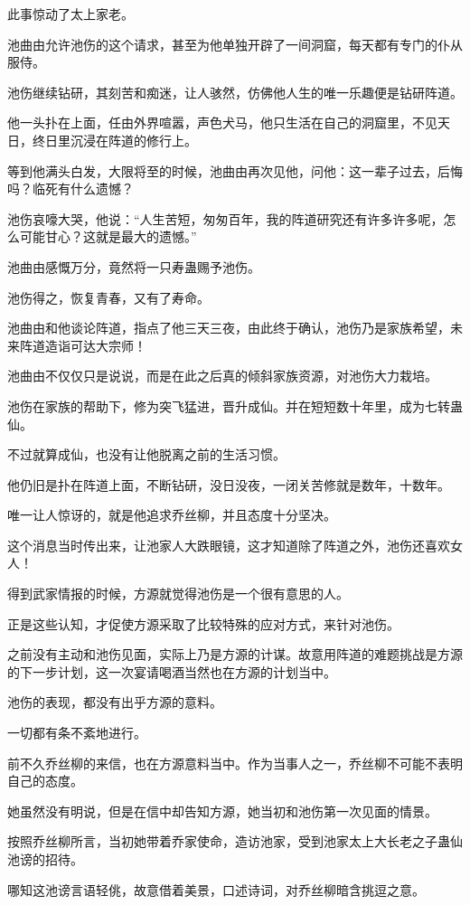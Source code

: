 \begin{this_body}
此事惊动了太上家老。

池曲由允许池伤的这个请求，甚至为他单独开辟了一间洞窟，每天都有专门的仆从服侍。

池伤继续钻研，其刻苦和痴迷，让人骇然，仿佛他人生的唯一乐趣便是钻研阵道。

他一头扑在上面，任由外界喧嚣，声色犬马，他只生活在自己的洞窟里，不见天日，终日里沉浸在阵道的修行上。

等到他满头白发，大限将至的时候，池曲由再次见他，问他：这一辈子过去，后悔吗？临死有什么遗憾？

池伤哀嚎大哭，他说：“人生苦短，匆匆百年，我的阵道研究还有许多许多呢，怎么可能甘心？这就是最大的遗憾。”

池曲由感慨万分，竟然将一只寿蛊赐予池伤。

池伤得之，恢复青春，又有了寿命。

池曲由和他谈论阵道，指点了他三天三夜，由此终于确认，池伤乃是家族希望，未来阵道造诣可达大宗师！

池曲由不仅仅只是说说，而是在此之后真的倾斜家族资源，对池伤大力栽培。

池伤在家族的帮助下，修为突飞猛进，晋升成仙。并在短短数十年里，成为七转蛊仙。

不过就算成仙，也没有让他脱离之前的生活习惯。

他仍旧是扑在阵道上面，不断钻研，没日没夜，一闭关苦修就是数年，十数年。

唯一让人惊讶的，就是他追求乔丝柳，并且态度十分坚决。

这个消息当时传出来，让池家人大跌眼镜，这才知道除了阵道之外，池伤还喜欢女人！

得到武家情报的时候，方源就觉得池伤是一个很有意思的人。

正是这些认知，才促使方源采取了比较特殊的应对方式，来针对池伤。

之前没有主动和池伤见面，实际上乃是方源的计谋。故意用阵道的难题挑战是方源的下一步计划，这一次宴请喝酒当然也在方源的计划当中。

池伤的表现，都没有出乎方源的意料。

一切都有条不紊地进行。

前不久乔丝柳的来信，也在方源意料当中。作为当事人之一，乔丝柳不可能不表明自己的态度。

她虽然没有明说，但是在信中却告知方源，她当初和池伤第一次见面的情景。

按照乔丝柳所言，当初她带着乔家使命，造访池家，受到池家太上大长老之子蛊仙池谤的招待。

哪知这池谤言语轻佻，故意借着美景，口述诗词，对乔丝柳暗含挑逗之意。


\end{this_body}
